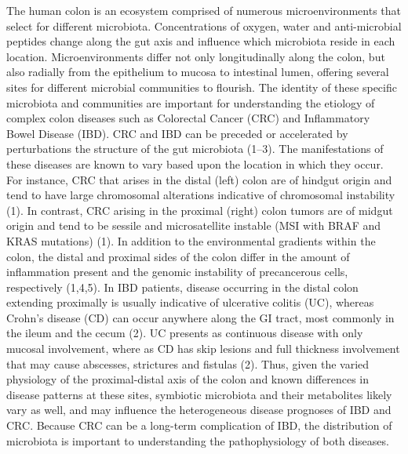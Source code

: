 \documentclass[12pt,]{article}
\begin{document}
The human colon is an ecosystem comprised of numerous microenvironments
that select for different microbiota. Concentrations of oxygen, water
and anti-microbial peptides change along the gut axis and influence
which microbiota reside in each location. Microenvironments differ not
only longitudinally along the colon, but also radially from the
epithelium to mucosa to intestinal lumen, offering several sites for
different microbial communities to flourish. The identity of these
specific microbiota and communities are important for understanding the
etiology of complex colon diseases such as Colorectal Cancer (CRC) and
Inflammatory Bowel Disease (IBD). CRC and IBD can be preceded or
accelerated by perturbations the structure of the gut microbiota (1--3).
The manifestations of these diseases are known to vary based upon the
location in which they occur. For instance, CRC that arises in the
distal (left) colon are of hindgut origin and tend to have large
chromosomal alterations indicative of chromosomal instability (1). In
contrast, CRC arising in the proximal (right) colon tumors are of midgut
origin and tend to be sessile and microsatellite instable (MSI with BRAF
and KRAS mutations) (1). In addition to the environmental gradients
within the colon, the distal and proximal sides of the colon differ in
the amount of inflammation present and the genomic instability of
precancerous cells, respectively (1,4,5). In IBD patients, disease
occurring in the distal colon extending proximally is usually indicative
of ulcerative colitis (UC), whereas Crohn's disease (CD) can occur
anywhere along the GI tract, most commonly in the ileum and the cecum
(2). UC presents as continuous disease with only mucosal involvement,
where as CD has skip lesions and full thickness involvement that may
cause abscesses, strictures and fistulas (2). Thus, given the varied
physiology of the proximal-distal axis of the colon and known
differences in disease patterns at these sites, symbiotic microbiota and
their metabolites likely vary as well, and may influence the
heterogeneous disease prognoses of IBD and CRC. Because CRC can be a
long-term complication of IBD, the distribution of microbiota is
important to understanding the pathophysiology of both diseases.
\end{document}
